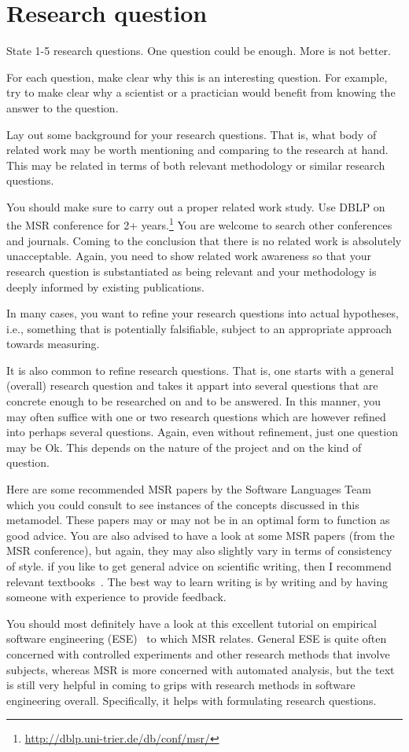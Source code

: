 \section{Research question}
\label{sec:research-question}

State 1-5 research questions. One question could be enough. More is
not better.

For each question, make clear why this is an interesting question. For
example, try to make clear why a scientist or a practician would
benefit from knowing the answer to the question.

Lay out some background for your research questions. That is, what
body of related work may be worth mentioning and comparing to the
research at hand. This may be related in terms of both relevant
methodology or similar research questions.

You should make sure to carry out a proper related work study. Use
DBLP on the MSR conference for 2+
years.\footnote{\url{http://dblp.uni-trier.de/db/conf/msr/}} You are
welcome to search other conferences and journals. Coming to the
conclusion that there is no related work is absolutely
unacceptable. Again, you need to show related work awareness so that
your research question is substantiated as being relevant and
your methodology is deeply informed by existing publications.

In many cases, you want to refine your research questions into actual
hypotheses, i.e., something that is potentially falsifiable, subject
to an appropriate approach towards measuring.

It is also common to refine research questions. That is, one starts
with a general (overall) research question and takes it appart into
several questions that are concrete enough to be researched on and to
be answered. In this manner, you may often suffice with one or two
research questions which are however refined into perhaps
several questions. Again, even without refinement, just one question may be
Ok. This depends on the nature of the project and on the kind of question.

Here are some recommended MSR papers by the Software Languages
Team~\cite{LaemmelLPV11,LaemmelP13,SchmorleizL15} which you could
consult to see instances of the concepts discussed in this
metamodel. These papers may or may not be in an optimal form to
function as good advice. You are also advised to have a look at some
MSR papers (from the MSR conference), but again, they may also
slightly vary in terms of consistency of style. if you like to get
general advice on scientific writing, then I recommend relevant
textbooks~\cite{Day98,Zobel09}. The best way to learn writing is by
writing and by having someone with experience to provide feedback.

You should most definitely have a look at this excellent tutorial on
empirical software engineering (ESE)~\cite{Easterbrook07} to which MSR
relates. General ESE is quite often concerned with controlled
experiments and other research methods that involve subjects, whereas
MSR is more concerned with automated analysis, but the text is still
very helpful in coming to grips with research methods in software
engineering overall. Specifically, it helps with formulating research questions.
